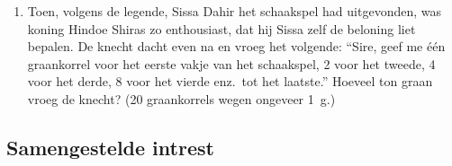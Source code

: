 \begin{enumerate}
    \item Toen, volgens de legende, Sissa Dahir het schaakspel had
    uitgevonden, was koning Hindoe Shiras zo enthousiast, dat hij
    Sissa zelf de beloning liet bepalen. De knecht dacht even na
    en vroeg het volgende: ``Sire, geef me \'e\'en graankorrel
    voor het eerste vakje van het schaakspel, 2 voor het tweede, 4
    voor het derde, 8 voor het vierde enz.\ tot het laatste.''
    Hoeveel ton graan vroeg de knecht? (20 graankorrels wegen
    ongeveer \SI{1}{\gram}.)

   
\end{enumerate}

\subsection{Samengestelde intrest}
